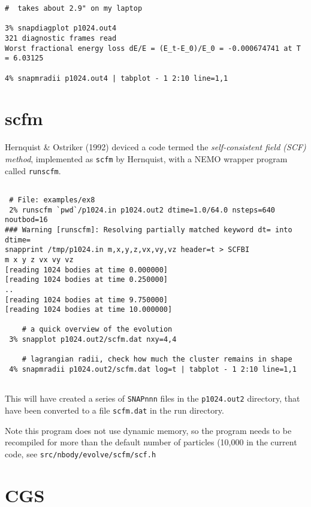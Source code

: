 {\begin{verbatim}
#  takes about 2.9" on my laptop

3% snapdiagplot p1024.out4
321 diagnostic frames read
Worst fractional energy loss dE/E = (E_t-E_0)/E_0 = -0.000674741 at T = 6.03125

4% snapmradii p1024.out4 | tabplot - 1 2:10 line=1,1

\end{verbatim}\normalsize



\section{scfm}

Hernquist \& Ostriker (1992) deviced a code termed the 
{\it self-consistent field (SCF) method}, implemented as {\tt scfm} by
Hernquist, with a NEMO wrapper program called {\tt runscfm}.

\footnotesize\begin{verbatim}
  
 # File: examples/ex8 
 2% runscfm `pwd`/p1024.in p1024.out2 dtime=1.0/64.0 nsteps=640 noutbod=16
### Warning [runscfm]: Resolving partially matched keyword dt= into dtime=
snapprint /tmp/p1024.in m,x,y,z,vx,vy,vz header=t > SCFBI
m x y z vx vy vz
[reading 1024 bodies at time 0.000000]
[reading 1024 bodies at time 0.250000]
..
[reading 1024 bodies at time 9.750000]
[reading 1024 bodies at time 10.000000]

    # a quick overview of the evolution 
 3% snapplot p1024.out2/scfm.dat nxy=4,4

    # lagrangian radii, check how much the cluster remains in shape
 4% snapmradii p1024.out2/scfm.dat log=t | tabplot - 1 2:10 line=1,1
 

\end{verbatim}\normalsize

This will have created a series of {\tt SNAPnnn} files in the {\tt p1024.out2}
directory, that have been converted to a file {\tt scfm.dat} in the 
run directory.

Note this program does not use dynamic memory, so the program needs to 
be recompiled for more than the default number of particles (10,000 in
the current code, see {\tt src/nbody/evolve/scfm/scf.h}

\section{CGS}

}
